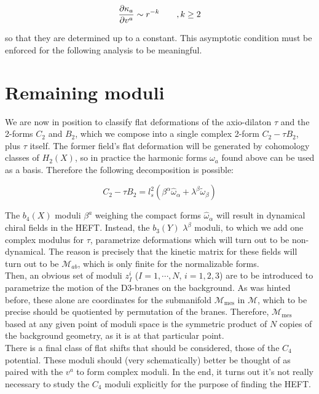 \begin{equation}
	\frac{\partial\kappa_a}{\partial v^a} \sim r^{-k} \quad \quad, k \geq 2
	\label{asycond}
\end{equation}

so that they are determined up to a constant. This asymptotic condition must be enforced for the following analysis to be meaningful.

\section{Remaining moduli}

We are now in position to classify flat deformations of the axio-dilaton $\tau$ and the 2-forms $C_2$ and $B_2$, which we compose into a single complex 2-form $C_2 - \tau B_2$, plus $\tau$ itself. The former field's flat deformation will be generated by cohomology classes of $H_2(X)$, so in practice the harmonic forms $\omega_a$ found above can be used as a basis. Therefore the following decomposition is possible:

\begin{equation}
	C_2 - \tau B_2 = l_s^2 \left( \beta^\alpha \hat\omega_\alpha + \lambda^\beta \tilde \omega_\beta \right)
	\label{}
\end{equation}

The $b_4(X)$ moduli $\beta^a$ weighing the compact forms $\hat\omega_\alpha$ will result in dynamical chiral fields in the HEFT. Instead, the $b_3(Y)$ $\lambda^\beta$ moduli, to which we add one complex modulus for $\tau$, parametrize deformations which will turn out to be non-dynamical. The reason is precisely that the kinetic matrix for these fields will turn out to be $\mathcal{M}_{ab}$, which is only finite for the normalizable forms.\\

Then, an obvious set of moduli $z_I^i$ ($I=1,\cdots,N$, $i = 1,2,3$) are to be introduced to parametrize the motion of the D3-branes on the background. As was hinted before, these alone are coordinates for the submanifold $\mathcal{M}_\text{mes}$ in $\mathcal{M}$, which to be precise should be quotiented by permutation of the branes. Therefore, $\mathcal{M}_\text{mes}$ based at any given point of moduli space is the symmetric product of $N$ copies of the background geometry, as it is at that particular point.\\

There is a final class of flat shifts that should be considered, those of the $C_4$ potential. These moduli should (very schematically) better be thought of as paired with the $v^a$ to form complex moduli. In the end, it turns out it's not really necessary to study the $C_4$ moduli explicitly for the purpose of finding the HEFT.


